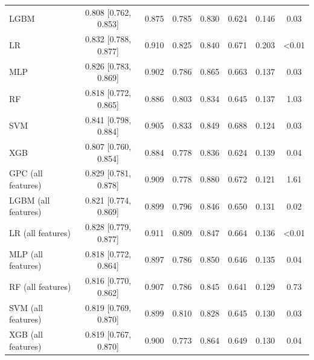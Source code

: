 \begin{tabular}{lccccccc}
LGBM & 0.808 [0.762, 0.853] & 0.875 & 0.785 & 0.830 & 0.624 & 0.146 & 0.03 \\
LR & 0.832 [0.788, 0.877] & 0.910 & 0.825 & 0.840 & 0.671 & 0.203 & <0.01 \\
MLP & 0.826 [0.783, 0.869] & 0.902 & 0.786 & 0.865 & 0.663 & 0.137 & 0.03 \\
RF & 0.818 [0.772, 0.865] & 0.886 & 0.803 & 0.834 & 0.645 & 0.137 & 1.03 \\
SVM & 0.841 [0.798, 0.884] & 0.905 & 0.833 & 0.849 & 0.688 & 0.124 & 0.03 \\
XGB & 0.807 [0.760, 0.854] & 0.884 & 0.778 & 0.836 & 0.624 & 0.139 & 0.04 \\
\midrule
GPC (all features) & 0.829 [0.781, 0.878] & 0.909 & 0.778 & 0.880 & 0.672 & 0.121 & 1.61 \\
LGBM (all features) & 0.821 [0.774, 0.869] & 0.899 & 0.796 & 0.846 & 0.650 & 0.131 & 0.02 \\
LR (all features) & 0.828 [0.779, 0.877] & 0.911 & 0.809 & 0.847 & 0.664 & 0.136 & <0.01 \\
MLP (all features) & 0.818 [0.772, 0.864] & 0.897 & 0.786 & 0.850 & 0.646 & 0.135 & 0.04 \\
RF (all features) & 0.816 [0.770, 0.862] & 0.907 & 0.786 & 0.845 & 0.641 & 0.129 & 0.73 \\
SVM (all features) & 0.819 [0.769, 0.870] & 0.899 & 0.810 & 0.828 & 0.645 & 0.130 & 0.03 \\
XGB (all features) & 0.819 [0.767, 0.870] & 0.900 & 0.773 & 0.864 & 0.649 & 0.130 & 0.04 \\
\bottomrule
\end{tabular}